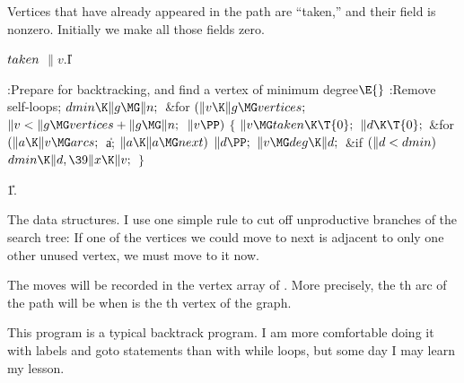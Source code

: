 Vertices that have already appeared in the path are ``taken,''
and
their  field is nonzero. Initially we make all those fields zero.

\Y\B\4\D$\\{taken}$ \5
$\|v.{}$\|I\par
\Y\B\4:Prepare  for backtracking, and find a vertex  of
minimum degree\X${}\E{}$\6
:Remove self-loops\X;\6
${}\\{dmin}\K\|g\MG\|n;{}$\6
\&{for} ${}(\|v\K\|g\MG\\{vertices};{}$ ${}\|v<\|g\MG\\{vertices}+\|g\MG\|n;{}$
${}\|v\PP){}$\5
${}\{{}$\1\6
${}\|v\MG\\{taken}\K\T{0};{}$\6
${}\|d\K\T{0};{}$\6
\&{for} ${}(\|a\K\|v\MG\\{arcs};{}$ \|a; ${}\|a\K\|a\MG\\{next}){}$\1\5
${}\|d\PP;{}$\2\6
${}\|v\MG\\{deg}\K\|d;{}$\6
\&{if} ${}(\|d<\\{dmin}){}$\1\5
${}\\{dmin}\K\|d,\39\|x\K\|v;{}$\2\6
\4${}\}{}$\2\par
\U1.\fi

The data structures. I use one simple rule to cut off
unproductive
branches of the search tree: If one of the vertices we could move to next
is adjacent to only one other unused vertex, we must move to it now.

The moves will be recorded in the vertex array of . More precisely, the
th arc of the path will be  when  is the %
th vertex of
the graph.

This program is a typical backtrack program. I am more comfortable doing
it with labels and goto statements than with while loops, but some day
I may learn my lesson.

